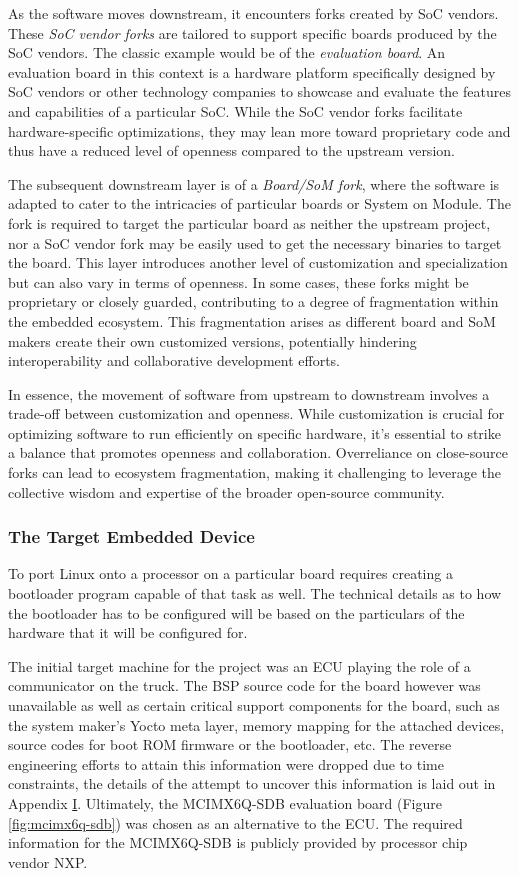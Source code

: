 As the software moves downstream, it encounters forks created by SoC vendors. These \textit{SoC vendor forks} are tailored to support specific boards produced by the SoC vendors. The classic example would be of the \textit{evaluation board}. An evaluation board in this context is a hardware platform specifically designed by SoC vendors or other technology companies to showcase and evaluate the features and capabilities of a particular SoC. While the SoC vendor forks facilitate hardware-specific optimizations, they may lean more toward proprietary code and thus have a reduced level of openness compared to the upstream version.

The subsequent downstream layer is of a \textit{Board/SoM fork}, where the software is adapted to cater to the intricacies of particular boards or System on Module. The fork is required to target the particular board as neither the upstream project, nor a SoC vendor fork may be easily used to get the necessary binaries to target the board. This layer introduces another level of customization and specialization but can also vary in terms of openness. In some cases, these forks might be proprietary or closely guarded, contributing to a degree of fragmentation within the embedded ecosystem. This fragmentation arises as different board and SoM makers create their own customized versions, potentially hindering interoperability and collaborative development efforts.

In essence, the movement of software from upstream to downstream involves a trade-off between customization and openness. While customization is crucial for optimizing software to run efficiently on specific hardware, it's essential to strike a balance that promotes openness and collaboration. Overreliance on close-source forks can lead to ecosystem fragmentation, making it challenging to leverage the collective wisdom and expertise of the broader open-source community.

\subsubsection{The Target Embedded Device}

To port Linux onto a processor on a particular board requires creating a bootloader program capable of that task as well. The technical details as to how the bootloader has to be configured will be based on the particulars of the hardware that it will be configured for.

The initial target machine for the project was an ECU playing the role of a communicator on the truck. The BSP source code for the board however was unavailable as well as certain critical support components for the board, such as the system maker's Yocto meta layer, memory mapping for the attached devices, source codes for boot ROM firmware or the bootloader, etc. The reverse engineering efforts to attain this information were dropped due to time constraints, the details of the attempt to uncover this information is laid out in Appendix \hyperref[rtc-c300]{I}. Ultimately, the MCIMX6Q-SDB evaluation board (Figure \ref{fig:mcimx6q-sdb}) was chosen as an alternative to the ECU. The required information for the MCIMX6Q-SDB is publicly provided by processor chip vendor NXP.

